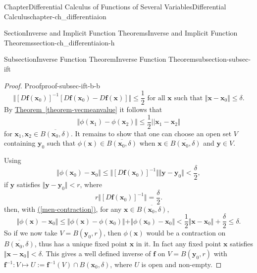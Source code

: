 \documentclass[oneside,10pt,]{book}
\newcommand{\xreffont}{\relax}
\numberwithin{equation}{section}
\begin{document}
\begin{chapterptx}{Chapter}{Differential Calculus of Functions of Several Variables}{}{Differential Calculus}{}{}{chapter-ch_differentiaion}
\begin{sectionptx}{Section}{Inverse and Implicit Function Theorems}{}{Inverse and Implicit Function Theorems}{}{}{section-ch_differentiaion-h}
\begin{subsectionptx}{Subsection}{Inverse Function Theorem}{}{Inverse Function Theorem}{}{}{subsection-subsec-ift}
\begin{proof}{Proof}{}{proof-subsec-ift-b-b}
\begin{equation}
\Vert \left[D{\mathbf f}({\mathbf x}_{0})\right]^{-1}\left[ D{\mathbf f}({\mathbf x}_{0})- D {\mathbf f}({\mathbf x})\right]
\Vert \le \frac 12 \text{ for all } {\mathbf x} \text{ such that }
\Vert {\mathbf x}-{\mathbf x}_{0}\Vert \le \delta.\label{men-der1-2}
\end{equation}
By \hyperref[theorem-vecmeanvalue]{Theorem~{\xreffont\ref{theorem-vecmeanvalue}}}  it follows that%
\begin{equation}
\Vert \phi ({\mathbf x}_{1})-\phi ({\mathbf x}_{2})\Vert \le \frac 12 ||{\mathbf x}_{1}-{\mathbf x}_{2}\Vert\label{men-contraction}
\end{equation}
for \({\mathbf x}_{1}, {\mathbf x}_{2}\in \overline{B({\mathbf x}_{0}, \delta)}\). It remains to show that one can choose an open set \(V\) containing \({\mathbf y}_{0}\) such that \(\phi ({\mathbf x})\in \overline{B({\mathbf x}_{0}, \delta)}\) when \({\mathbf x}\in \overline{B({\mathbf x}_{0}, \delta)}\) and \({\mathbf y}\in V\).%
\par
Using%
\begin{equation*}
\Vert \phi ({\mathbf x}_{0})- {\mathbf x}_{0}\Vert \le
\Vert \left[D{\mathbf f}({\mathbf x}_{0})\right]^{-1}\Vert
\Vert {\mathbf y}-{\mathbf y}_{0}\Vert < \frac{\delta}{2},
\end{equation*}
if \({\mathbf y}\) satisfies \(\Vert {\mathbf y}-{\mathbf y}_{0}\Vert < r\), where%
\begin{equation*}
r \Vert \left[D{\mathbf f}({\mathbf x}_{0})\right]^{-1}\Vert = \frac{\delta}{2}.
\end{equation*}
then, with \hyperref[men-contraction]{({\xreffont\ref{men-contraction}})}, for any \({\mathbf x} \in \overline{ B({\mathbf x}_{0}, \delta)}\),%
\begin{equation*}
\Vert \phi ({\mathbf x})- {\mathbf x}_{0}\Vert \le 
\Vert \phi ({\mathbf x})-\phi ( {\mathbf x}_{0})\Vert +  \Vert \phi ({\mathbf x}_{0})- {\mathbf x}_{0}\Vert
< \frac 12 \Vert {\mathbf x}-{\mathbf x}_{0} \Vert + \frac{\delta}{2} \le \delta.
\end{equation*}
So if we now take \(V=B({\mathbf y}_{0}, r)\), then \(\phi ({\mathbf x})\) would be a contraction on \(\overline{B({\mathbf x}_{0}, \delta)}\), thus has a unique fixed point \({\mathbf x}\) in it. In fact any fixed point \({\mathbf x}\) satisfies \(\Vert {\mathbf x}- {\mathbf x}_{0}\Vert < \delta\). This gives a well defined inverse of \({\mathbf f}\) on \(V=B({\mathbf y}_{0}, r)\) with \({\mathbf f}^{-1}: V\mapsto U:={\mathbf f}^{-1}(V)\cap B({\mathbf x}_{0}, \delta)\), where \(U\) is open and non-empty.%

\end{proof}
\end{subsectionptx}
\end{sectionptx}
\end{chapterptx}
\end{document}
